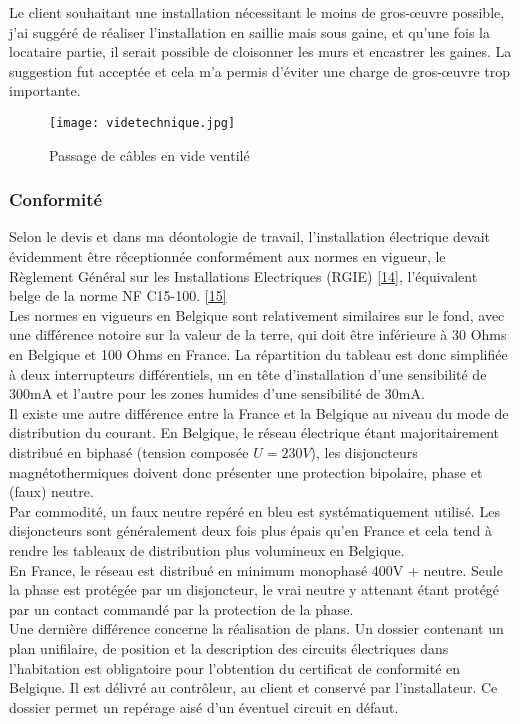 \documentclass[a4paper, 12pt]{article}
\begin{document}
Le client souhaitant une installation nécessitant le moins de gros-\oe{}uvre possible, j'ai suggéré de réaliser l'installation en saillie mais sous gaine, et qu'une fois la locataire partie, il serait possible de cloisonner les murs et encastrer les gaines. La suggestion fut acceptée et cela m'a permis d'éviter une charge de gros-\oe{}uvre trop importante.\\

\begin{figure}[h!]
	\texttt{[image: videtechnique.jpg]}
		\centering
		\caption{Passage de câbles en vide ventilé}
\end{figure}

\subsubsection{Conformité}

Selon le devis et dans ma déontologie de travail, l'installation électrique devait évidemment être réceptionnée conformément aux normes en vigueur, le Règlement Général sur les Installations Electriques (RGIE) \href{https://www.legrand.be/montage/fr/rgie}{[14]}, l'équivalent belge de la norme NF C15-100. \href{https://www.legrand.fr/pro/normes-et-reglementations/norme-nf-c-15-100/norme-nf-c-15-100-suivez-le-guide}{[15]}\\

Les normes en vigueurs en Belgique sont relativement similaires sur le fond, avec une différence notoire sur la valeur de la terre, qui doit être inférieure à 30 Ohms en Belgique et 100 Ohms en France. La répartition du tableau est donc simplifiée à deux interrupteurs différentiels, un en tête d'installation d'une sensibilité de 300mA et l'autre pour les zones humides d'une sensibilité de 30mA.\\Il existe une autre différence entre la France et la Belgique au niveau du mode de distribution du courant. En Belgique, le réseau électrique étant majoritairement distribué en biphasé (tension composée $U=230V$), les disjoncteurs magnétothermiques doivent donc présenter une protection bipolaire, phase et (faux) neutre.\\Par commodité, un faux neutre repéré en bleu est systématiquement utilisé. Les disjoncteurs sont généralement deux fois plus épais qu’en France et cela tend à rendre les tableaux de distribution plus volumineux en Belgique.\\En France, le réseau est distribué en minimum monophasé 400V + neutre. Seule la phase est protégée par un disjoncteur, le vrai neutre y attenant étant protégé par un contact commandé par la protection de la phase.\\Une dernière différence concerne la réalisation de plans. Un dossier contenant un plan unifilaire, de position et la description des circuits électriques dans l'habitation est obligatoire pour l'obtention du certificat de conformité en Belgique. Il est délivré au contrôleur, au client et conservé par l'installateur. Ce dossier permet un repérage aisé d'un éventuel circuit en défaut.\\
\end{document}
